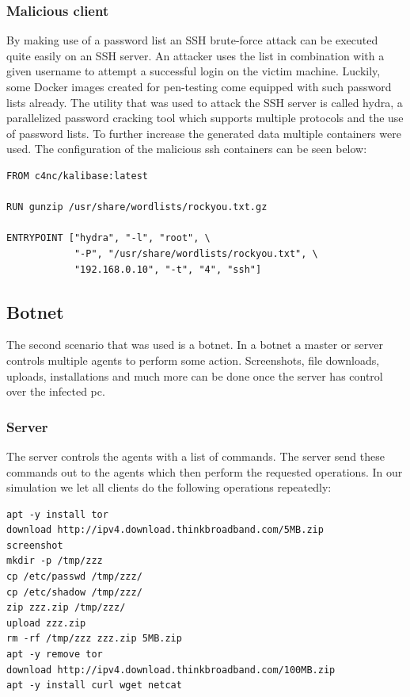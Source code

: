 \documentclass[conference]{IEEEtran}
\begin{document}
\subsubsection{Malicious client}
By making use of a password list an SSH brute-force attack can be executed quite easily on an SSH server. An attacker uses the list in combination with a given username to attempt a successful login on the victim machine. Luckily, some Docker images created for pen-testing come equipped with such password lists already. The utility that was used to attack the SSH server is called hydra, a parallelized password cracking tool which supports multiple protocols and the use of password lists. To further increase the generated data multiple containers were used.
The configuration of the malicious ssh containers can be seen below:

\begin{lstlisting}[basicstyle=\footnotesize]
FROM c4nc/kalibase:latest

RUN gunzip /usr/share/wordlists/rockyou.txt.gz

ENTRYPOINT ["hydra", "-l", "root", \
            "-P", "/usr/share/wordlists/rockyou.txt", \
            "192.168.0.10", "-t", "4", "ssh"]
\end{lstlisting}

\subsection{Botnet}
The second scenario that was used is a botnet. In a botnet a master or server controls multiple agents to perform some action. Screenshots, file downloads, uploads, installations and much more can be done once the server has control over the infected pc. 

\subsubsection{Server}
The server controls the agents with a list of commands. The server send these commands out to the agents which then perform the requested operations. In our simulation we let all clients do the following operations repeatedly:

\begin{lstlisting}[basicstyle=\footnotesize]
apt -y install tor
download http://ipv4.download.thinkbroadband.com/5MB.zip
screenshot
mkdir -p /tmp/zzz
cp /etc/passwd /tmp/zzz/
cp /etc/shadow /tmp/zzz/
zip zzz.zip /tmp/zzz/
upload zzz.zip
rm -rf /tmp/zzz zzz.zip 5MB.zip
apt -y remove tor
download http://ipv4.download.thinkbroadband.com/100MB.zip
apt -y install curl wget netcat

\end{lstlisting}
\end{document}
